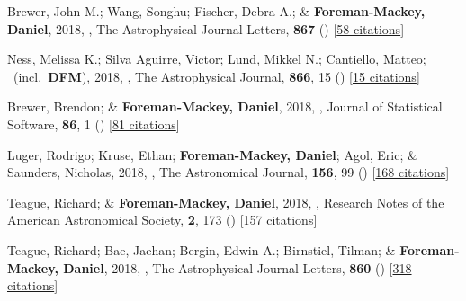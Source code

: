 \item[{\color{numcolor}\scriptsize40}] Brewer, John M.; Wang, Songhu; Fischer, Debra A.; \& \textbf{Foreman-Mackey, Daniel}, 2018, , The Astrophysical Journal Letters, \textbf{867} () [\href{https://ui.adsabs.harvard.edu/abs/2018ApJ...867L...3B}{58 citations}]

\item[{\color{numcolor}\scriptsize39}] Ness, Melissa K.; Silva Aguirre, Victor; Lund, Mikkel N.; Cantiello, Matteo; \etal\ (incl.\ \textbf{DFM}), 2018, , The Astrophysical Journal, \textbf{866}, 15 () [\href{https://ui.adsabs.harvard.edu/abs/2018ApJ...866...15N}{15 citations}]

\item[{\color{numcolor}\scriptsize38}] Brewer, Brendon; \& \textbf{Foreman-Mackey, Daniel}, 2018, , Journal of Statistical Software, \textbf{86}, 1 () [\href{https://scholar.google.com/scholar?cites=789224875040810871}{81 citations}]

\item[{\color{numcolor}\scriptsize37}] Luger, Rodrigo; Kruse, Ethan; \textbf{Foreman-Mackey, Daniel}; Agol, Eric; \& Saunders, Nicholas, 2018, , The Astronomical Journal, \textbf{156}, 99 () [\href{https://ui.adsabs.harvard.edu/abs/2018AJ....156...99L}{168 citations}]

\item[{\color{numcolor}\scriptsize36}] Teague, Richard; \& \textbf{Foreman-Mackey, Daniel}, 2018, , Research Notes of the American Astronomical Society, \textbf{2}, 173 () [\href{https://ui.adsabs.harvard.edu/abs/2018RNAAS...2..173T}{157 citations}]

\item[{\color{numcolor}\scriptsize35}] Teague, Richard; Bae, Jaehan; Bergin, Edwin A.; Birnstiel, Tilman; \& \textbf{Foreman-Mackey, Daniel}, 2018, , The Astrophysical Journal Letters, \textbf{860} () [\href{https://ui.adsabs.harvard.edu/abs/2018ApJ...860L..12T}{318 citations}]

